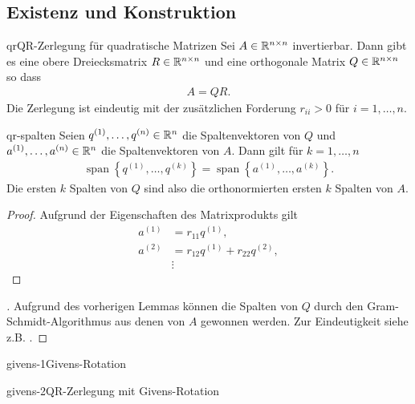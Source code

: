 \subsection{Existenz und Konstruktion}

\begin{Satz*}{qr}{QR-Zerlegung für quadratische Matrizen}
  Sei $A\in \mathbb R^{n\times n}$ invertierbar. Dann gibt es eine obere
  Dreiecksmatrix $R\in\mathbb R^{n\times n}$ und eine orthogonale Matrix
  $Q\in\mathbb R^{n\times n}$ so dass
  \begin{gather}
    A=QR.
  \end{gather}
  Die Zerlegung ist eindeutig mit der zusätzlichen Forderung $r_{ii}>0$ für $i=1,\dots,n$.
\end{Satz*}

\begin{Lemma}{qr-spalten}
  Seien $q^{(1)},\dots, q^{(n)} \in\mathbb R^n$ die Spaltenvektoren von $Q$
  und $a^{(1)},\dots, a^{(n)} \in\mathbb R^n$ die Spaltenvektoren von
  $A$. Dann gilt für $k=1,\dots,n$
  \begin{gather}
    \operatorname{span}\left\{q^{(1)},\dots, q^{(k)}\right\}
    =
    \operatorname{span}\left\{a^{(1)},\dots, a^{(k)}\right\}.
  \end{gather}
  Die ersten $k$ Spalten von $Q$ sind also die orthonormierten ersten
  $k$ Spalten von $A$.
\end{Lemma}

\begin{proof}
  Aufgrund der Eigenschaften des Matrixprodukts gilt
  \begin{align}
    a^{(1)} &= r_{11} q^{(1)},\\
    a^{(2)} &= r_{12} q^{(1)} + r_{22} q^{(2)},\\
    &\vdots
  \end{align}
\end{proof}

\begin{proof}[]
  Aufgrund des vorherigen Lemmas können die Spalten von $Q$ durch den
  Gram-Schmidt-Algorithmus aus denen von $A$ gewonnen werden. Zur
  Eindeutigkeit siehe z.B. \cite{Rannacher17}.
\end{proof}
\begin{Algorithmus*}{givens-1}{Givens-Rotation}
  
\end{Algorithmus*}

\begin{Algorithmus*}{givens-2}{QR-Zerlegung mit Givens-Rotation}
  
\end{Algorithmus*}


